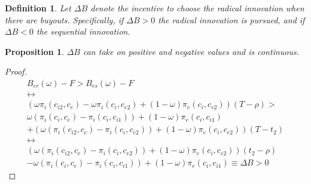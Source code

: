 \documentclass[12pt]{report}
\newtheorem{proposition}{Proposition}
\newtheorem{definition}{Definition}
\numberwithin{equation}{section}
\begin{document}
\begin{definition}
Let $\Delta B$ denote the incentive to choose the radical innovation when there are buyouts. Specifically, if $\Delta B >0$ the radical innovation is pursued, and if $\Delta B <0$ the sequential innovation. 
\end{definition}
\begin{proposition}
$\Delta B$ can take on positive and negative values and is continuous. 
\end{proposition}
\begin{proof}
\begin{align*}
B_{er}(\omega)-F > B_{es}(\omega)-F \\
\leftrightarrow \\
\left(\omega\pi_{i}(c_{i2},c_{e})-\omega \pi_{i}(c_{i},c_{e2})+(1-\omega)\pi_{e}(c_{i},c_{e2}) \right) \left( T - \rho \right)> \\ 
\omega(\pi_i(c_i,c_{e})-\pi_i(c_i,c_{i1}))+(1-\omega)\pi_e(c_i,c_{i1}) \\
+(\omega(\pi_i(c_{i2},c_e)- \pi_i(c_{i},c_{e2}))+(1-\omega)\pi_e(c_{i},c_{e2}))(T-t_2) \\
\leftrightarrow \\
\left(\omega (\pi_{i}(c_{i2},c_{e})- \pi_{i}(c_{i},c_{e2}))+(1-\omega)\pi_{e}(c_{i},c_{e2}) \right) \left( t_2- \rho \right)  \\
-\omega(\pi_i(c_i,c_{e})-\pi_i(c_i,c_{i1}))+(1-\omega)\pi_e(c_i,c_{i1}) \equiv \Delta B >0 
\end{align*}

\end{proof}
\end{document}
